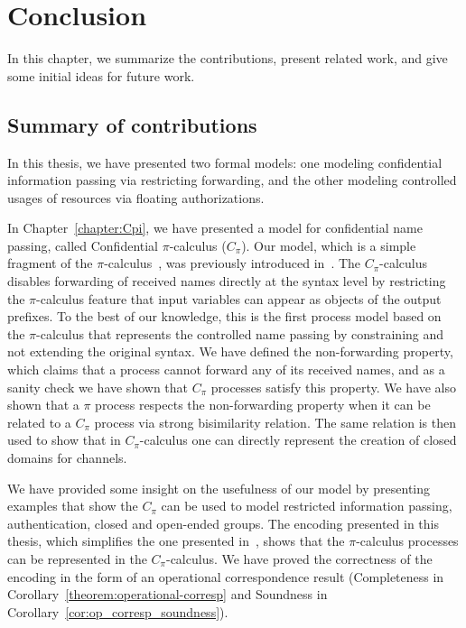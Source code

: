 \chapter{Conclusion}\label{sec:Conclusions}

In this chapter, we summarize the contributions, present related work, and give some initial ideas for future work. 

\section{Summary of contributions}
In this thesis, we have presented two formal models: one modeling confidential information passing via restricting forwarding, and the other modeling controlled usages of resources via floating authorizations.

In Chapter~\ref{chapter:Cpi}, we have presented a model for confidential name passing, called Confidential $\pi$-calculus ($C_\pi$). Our model, which is a simple fragment of the $\pi$-calculus~\cite{pi_calculus}, was previously introduced in~\cite{DBLP:journals/corr/abs-1902-09927}. 
The $C_\pi$-calculus disables forwarding of received names directly at the syntax level by restricting the $\pi$-calculus feature that input variables can appear as objects of the output prefixes. 
To the best of our knowledge, this is the first process model based on the $\pi$-calculus 
that %
represents the controlled name passing by constraining and not extending the original syntax. 
We have defined the non-forwarding property, which claims that a process cannot forward any of its received names, and as a sanity check we have shown that $C_\pi$ processes satisfy this property. 
We have also shown that a $\pi$ process respects the non-forwarding property when it can be related to a $C_\pi$ process via strong bisimilarity relation. The same relation is then used to show that in $C_\pi$-calculus one can directly represent the creation of closed domains for channels.

We have provided some insight on the usefulness of our model by presenting examples that show the $C_\pi$ can be used to model restricted information passing, authentication, closed and open-ended groups.
The encoding presented in this thesis, which simplifies the one presented in~\cite{DBLP:journals/corr/abs-1902-09927}, shows that the $\pi$-calculus processes can be represented in the $C_\pi$-calculus. We have proved the correctness of the encoding in the form of an operational correspondence result (Completeness in Corollary~\ref{theorem:operational-corresp} and Soundness in Corollary~\ref{cor:op_corresp_soundness}). %

